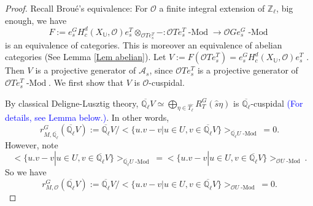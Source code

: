 \documentclass{article}
\newcommand{\red}[1]{\textcolor{red}{#1}}
\newcommand{\blue}[1]{\textcolor{blue}{#1}}
\newcommand{\Rep}{\operatorname{Rep}}
\newcommand{\Modl}{\operatorname{-Mod}}
\begin{document}
	\begin{proof}
		
		Recall Broué's equivalence: For $\mathcal{O}$ a finite integral extension of $\mathbb{Z}_{\ell}$, big enough, we have
		$$F:=e_s^GH^d_c(X_{\mathbb{U}}, \mathcal{O})e_s^T\otimes_{\mathcal{O}Te_s^T}-: \mathcal{O}Te_s^T\Modl \to \mathcal{O}Ge_s^G\Modl$$ is an equivalence of categories. This is moreover an equivalence of abelian categories (See Lemma \ref{Lem abelian}). Let $V:=F(\mathcal{O}Te_s^T)=e_s^GH^d_c(X_{\mathbb{U}}, \mathcal{O})e_s^T$ %
		. Then $V$ is a projective generator of $\mathcal{A}_s$, since $\mathcal{O}Te_s^T$ is a projective generator of $\mathcal{O}Te_s^T\Modl$. We first show that $V$ is $\mathcal{O}$-cuspidal.
		
		By classical Deligne-Lusztig theory, $\overline{\mathbb{Q}_{\ell}}V \simeq \bigoplus_{\eta \in \hat{T_{\ell}}}R_T^G(\hat{s}\eta)$ 
		is $\overline{\mathbb{Q}_{\ell}}$-cuspidal \blue{(For details, see Lemma below.)}. 
		In other words, 
		$$r^G_{M, \overline{\mathbb{Q}_{\ell}}}(\overline{\mathbb{Q}_{\ell}}V):=\overline{\mathbb{Q}_{\ell}}V/<\{u.v-v | u \in U, v \in \overline{\mathbb{Q}_{\ell}}V\}>_{\overline{\mathbb{Q}_{\ell}}U\Modl}=0.$$
		However, note  
		$$<\{u.v-v | u \in U, v \in \overline{\mathbb{Q}_{\ell}}V\}>_{\overline{\mathbb{Q}_{\ell}}U\Modl}=<\{u.v-v | u \in U, v \in \overline{\mathbb{Q}_{\ell}}V\}>_{\mathcal{O}U\Modl}.$$
		So we have 
		$$r^G_{M, \mathcal{O}}(\overline{\mathbb{Q}_{\ell}}V):=\overline{\mathbb{Q}_{\ell}}V/<\{u.v-v | u \in U, v \in \overline{\mathbb{Q}_{\ell}}V\}>_{\mathcal{O}U\Modl}=0.$$
		

\end{proof}
\end{document}
